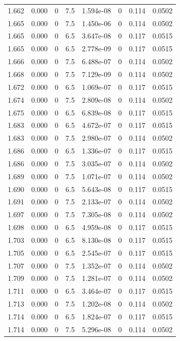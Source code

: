 \documentclass[preview]{standalone}
\begin{document}
{{{{{{{{{{{{{{{{{{{\begin{tabular}{L{1.2cm}C{1.2cm} C{0.3cm}C{0.5cm} C{1.4cm}C{1.4cm} C{1.4cm}C{1.4cm}}
  1.662  &  0.000  & 0     & 7.5 &  1.594e-08  & 0  & 0.114 &  0.0502   \\ 
  1.665  &  0.000  & 0     & 7.5 &  1.450e-06  & 0  & 0.114 &  0.0502   \\ 
  1.665  &  0.000  & 0     & 6.5 &  3.647e-08  & 0  & 0.117 &  0.0515   \\ 
  1.665  &  0.000  & 0     & 6.5 &  2.778e-09  & 0  & 0.117 &  0.0515   \\ 
  1.666  &  0.000  & 0     & 7.5 &  6.488e-07  & 0  & 0.114 &  0.0502   \\ 
  1.668  &  0.000  & 0     & 7.5 &  7.129e-09  & 0  & 0.114 &  0.0502   \\ 
  1.672  &  0.000  & 0     & 6.5 &  1.069e-07  & 0  & 0.117 &  0.0515   \\ 
  1.674  &  0.000  & 0     & 7.5 &  2.809e-08  & 0  & 0.114 &  0.0502   \\ 
  1.675  &  0.000  & 0     & 6.5 &  6.839e-08  & 0  & 0.117 &  0.0515   \\ 
  1.683  &  0.000  & 0     & 6.5 &  4.672e-07  & 0  & 0.117 &  0.0515   \\ 
  1.683  &  0.000  & 0     & 7.5 &  2.980e-07  & 0  & 0.114 &  0.0502   \\ 
  1.686  &  0.000  & 0     & 6.5 &  1.336e-07  & 0  & 0.117 &  0.0515   \\ 
  1.686  &  0.000  & 0     & 7.5 &  3.035e-07  & 0  & 0.114 &  0.0502   \\ 
  1.689  &  0.000  & 0     & 7.5 &  1.071e-07  & 0  & 0.114 &  0.0502   \\ 
  1.690  &  0.000  & 0     & 6.5 &  5.643e-08  & 0  & 0.117 &  0.0515   \\ 
  1.691  &  0.000  & 0     & 7.5 &  2.133e-07  & 0  & 0.114 &  0.0502   \\ 
  1.697  &  0.000  & 0     & 7.5 &  7.305e-08  & 0  & 0.114 &  0.0502   \\ 
  1.698  &  0.000  & 0     & 6.5 &  4.959e-08  & 0  & 0.117 &  0.0515   \\ 
  1.703  &  0.000  & 0     & 6.5 &  8.130e-08  & 0  & 0.117 &  0.0515   \\ 
  1.705  &  0.000  & 0     & 6.5 &  2.545e-07  & 0  & 0.117 &  0.0515   \\ 
  1.707  &  0.000  & 0     & 7.5 &  1.352e-07  & 0  & 0.114 &  0.0502   \\ 
  1.709  &  0.000  & 0     & 7.5 &  1.281e-07  & 0  & 0.114 &  0.0502   \\ 
  1.711  &  0.000  & 0     & 6.5 &  3.464e-07  & 0  & 0.117 &  0.0515   \\ 
  1.713  &  0.000  & 0     & 7.5 &  1.202e-08  & 0  & 0.114 &  0.0502   \\ 
  1.714  &  0.000  & 0     & 6.5 &  1.824e-07  & 0  & 0.117 &  0.0515   \\ 
  1.714  &  0.000  & 0     & 7.5 &  5.296e-08  & 0  & 0.114 &  0.0502   \\ 
\hline 
\end{tabular} 

}}}}}}}}}}}}}}}}}}}
\end{document}
